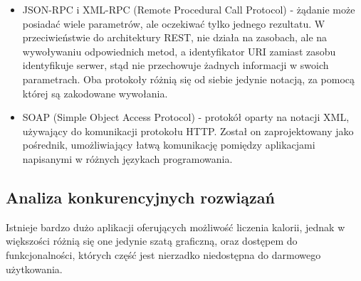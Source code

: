 \documentclass[12pt, a4paper]{article}
\begin{document}
\begin{sloppypar}
{{\begin{itemize}
\begin{itemize}
        Najczęściej używanym formatem wymiany danych jest notacja JSON.
        \item Interfejsy API REST korzystają z ujednoliconego interfejsu, co ułatwia 
        rozdzielenie implementacji klienta od implementacji usługi.
        \item Interfejsy API REST korzystają z bezstanowego modelu żądań. Żądania HTTP 
        powinny być niezależne i mogą występować w dowolnej kolejności, dlatego 
        zachowywanie informacji o stanie przejściowym między żądaniami nie jest możliwe.
        Informacje są przechowywane jedynie w zasobach, a każde żądanie powinno być 
        niepodzielną operacją.
        \item Interfejsy API REST są sterowane za pomocą hipermedialnych linków, 
        zawartych w reprezentacji.
      \end{itemize}
      \item JSON-RPC i XML-RPC (Remote Procedural Call Protocol) - żądanie może posiadać
      wiele parametrów, ale oczekiwać tylko jednego rezultatu. W przeciwieństwie do 
      architektury REST, nie działa na zasobach, ale na wywoływaniu odpowiednich metod,
      a identyfikator URI zamiast zasobu identyfikuje serwer, stąd nie przechowuje żadnych
      informacji w swoich parametrach. Oba protokoły różnią się od siebie jedynie notacją,
      za pomocą której są zakodowane wywołania.
      \item SOAP (Simple Object Access Protocol) - protokół oparty na notacji XML, używający
      do komunikacji protokołu HTTP. Został on zaprojektowany jako pośrednik, umożliwiający
      łatwą komunikację pomiędzy aplikacjami napisanymi w różnych językach programowania.
    \end{itemize} 
  }
  \subsection{Analiza konkurencyjnych rozwiązań}
  {
    Istnieje bardzo dużo aplikacji oferujących możliwość liczenia kalorii, jednak w 
    większości różnią się one jedynie szatą graficzną, oraz dostępem do funkcjonalności,
    których część jest nierzadko niedostępna do darmowego użytkowania.
}}
\end{sloppypar}
\end{document}

